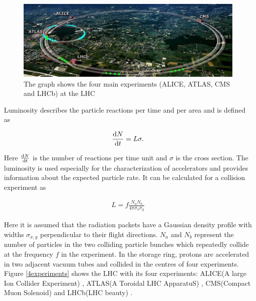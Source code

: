 \documentclass[12pt, a4paper]{thesis}
\begin{document}
\label{4experiments}
\begin{figure}[htbp]
\centering
\includegraphics[width=\textwidth]{../images/lhc.jpeg}
\caption{The graph shows the four main experiments (ALICE, ATLAS, CMS and LHCb) at the LHC \cite{lhcmap}}
\end{figure}



Luminosity describes the particle reactions per time and per area and is defined
as

\begin{align}
\dv{N}{t} = L \sigma.
\end{align}

Here \(\dv{N}{t}\) is the number of reactions per time unit and
$\sigma$ is the cross section.  The luminosity is used especially for
the characterization of accelerators and provides information about
the expected particle rate. It can be calculated for a collision
experiment as

\begin{align}
L = f \frac{N_{a}N_{b}}{4 \pi \sigma_{x} \sigma_{y}}
\end{align}

Here it is assumed that the radiation packets have a Gaussian density
profile with widths \(\sigma_{x,y}\) perpendicular to their flight
directions.  \(N_{a}\) and \(N_{b}\) represent the number of particles in
the two colliding particle bunches which repeatedly collide at the
frequency \(f\) in the experiment.  In the storage ring, protons are
accelerated in two adjacent vacuum tubes and collided in the centres
of four experiments. Figure \ref{4experiments} shows the LHC with its
four experiments: ALICE(A large Ion Collider Experiment) \cite{alice},
ATLAS(A Toroidal LHC ApparatuS) \cite{atlas}, CMS(Compact Muon
Solenoid) \cite{cms} and LHCb(LHC beauty) \cite{lhcb}.
\end{document}
